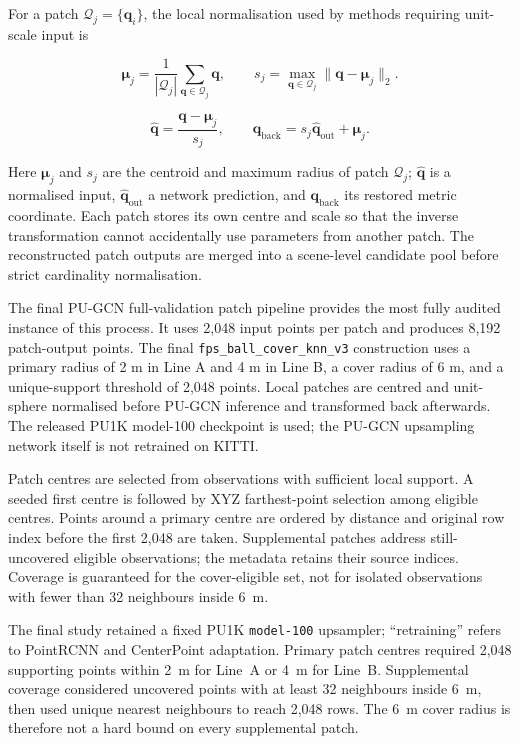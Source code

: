 For a patch $\mathcal Q_j=\{\mathbf q_i\}$, the local normalisation used by methods requiring unit-scale input is

\begin{equation}
\boldsymbol{\mu}_j=\frac1{|\mathcal{Q}_j|}\sum_{\mathbf{q}\in\mathcal{Q}_j}\mathbf{q},\qquad s_j=\max_{\mathbf{q}\in\mathcal{Q}_j}\|\mathbf{q}-\boldsymbol{\mu}_j\|_2.
\label{eq:fc-4-2}
\end{equation}

\begin{equation}
\hat{\mathbf{q}}=\frac{\mathbf{q}-\boldsymbol{\mu}_j}{s_j},\qquad\mathbf{q}_{\mathrm{back}}=s_j\hat{\mathbf{q}}_{\mathrm{out}}+\boldsymbol{\mu}_j.
\label{eq:fc-4-3}
\end{equation}

Here $\boldsymbol\mu_j$ and $s_j$ are the centroid and maximum radius of patch $\mathcal Q_j$; $\hat{\mathbf q}$ is a normalised input, $\hat{\mathbf q}_{\mathrm{out}}$ a network prediction, and $\mathbf q_{\mathrm{back}}$ its restored metric coordinate. Each patch stores its own centre and scale so that the inverse transformation cannot accidentally use parameters from another patch. The reconstructed patch outputs are merged into a scene-level candidate pool before strict cardinality normalisation.

The final PU-GCN full-validation patch pipeline provides the most fully audited instance of this process. It uses 2,048 input points per patch and produces 8,192 patch-output points. The final \texttt{fps\_ball\_cover\_knn\_v3} construction uses a primary radius of 2 m in Line A and 4 m in Line B, a cover radius of 6 m, and a unique-support threshold of 2,048 points. Local patches are centred and unit-sphere normalised before PU-GCN inference and transformed back afterwards. The released PU1K model-100 checkpoint is used; the PU-GCN upsampling network itself is not retrained on KITTI.

Patch centres are selected from observations with sufficient local
support. A seeded first centre is followed by XYZ farthest-point
selection among eligible centres. Points around a primary centre are
ordered by distance and original row index before the first 2,048
are taken. Supplemental patches address still-uncovered eligible
observations; the metadata retains their source indices. Coverage is
guaranteed for the cover-eligible set, not for isolated observations
with fewer than 32 neighbours inside 6~m.

The final study retained a fixed PU1K \texttt{model-100} upsampler;
``retraining'' refers to PointRCNN and CenterPoint adaptation. Primary patch centres required 2,048 supporting
points within 2~m for Line~A or 4~m for Line~B. Supplemental coverage
considered uncovered points with at least 32 neighbours inside 6~m,
then used unique nearest neighbours to reach 2,048 rows. The 6~m cover
radius is therefore not a hard bound on every supplemental patch.

